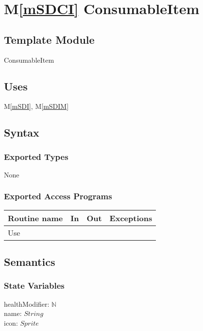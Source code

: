 \documentclass[12pt]{article}
\newcommand{\mref}[1]{M\ref{#1}}
\begin{document}
\newpage

\section* {\mref{mSDCI} ConsumableItem}

\subsection*{Template Module}

ConsumableItem

\subsection* {Uses}

\mref{mSDI}, \mref{mSDIM}

\subsection* {Syntax}

\subsubsection* {Exported Types}

None

\subsubsection* {Exported Access Programs}

\begin{tabular}{| l | l | l | l |}
\hline
\textbf{Routine name} & \textbf{In} & \textbf{Out} & \textbf{Exceptions}\\
\hline
Use & ~ & ~ & ~\\
\hline
\end{tabular}

\subsection* {Semantics}

\subsubsection* {State Variables}

healthModifier: $\mathbb{N}$\\
name: $String$\\
icon: $Sprite$
\end{document}
